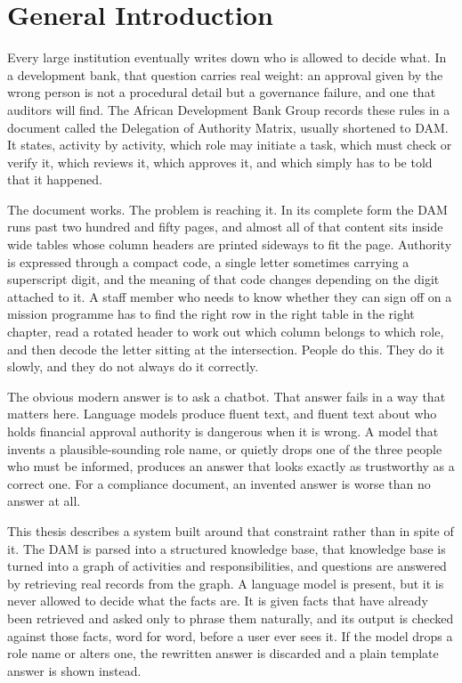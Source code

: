 \chapter*{General Introduction}

Every large institution eventually writes down who is allowed to decide what. In a development bank, that question carries real weight: an approval given by the wrong person is not a procedural detail but a governance failure, and one that auditors will find. The African Development Bank Group records these rules in a document called the Delegation of Authority Matrix, usually shortened to DAM. It states, activity by activity, which role may initiate a task, which must check or verify it, which reviews it, which approves it, and which simply has to be told that it happened.

The document works. The problem is reaching it. In its complete form the DAM runs past two hundred and fifty pages, and almost all of that content sits inside wide tables whose column headers are printed sideways to fit the page. Authority is expressed through a compact code, a single letter sometimes carrying a superscript digit, and the meaning of that code changes depending on the digit attached to it. A staff member who needs to know whether they can sign off on a mission programme has to find the right row in the right table in the right chapter, read a rotated header to work out which column belongs to which role, and then decode the letter sitting at the intersection. People do this. They do it slowly, and they do not always do it correctly.

The obvious modern answer is to ask a chatbot. That answer fails in a way that matters here. Language models produce fluent text, and fluent text about who holds financial approval authority is dangerous when it is wrong. A model that invents a plausible-sounding role name, or quietly drops one of the three people who must be informed, produces an answer that looks exactly as trustworthy as a correct one. For a compliance document, an invented answer is worse than no answer at all.

This thesis describes a system built around that constraint rather than in spite of it. The DAM is parsed into a structured knowledge base, that knowledge base is turned into a graph of activities and responsibilities, and questions are answered by retrieving real records from the graph. A language model is present, but it is never allowed to decide what the facts are. It is given facts that have already been retrieved and asked only to phrase them naturally, and its output is checked against those facts, word for word, before a user ever sees it. If the model drops a role name or alters one, the rewritten answer is discarded and a plain template answer is shown instead.

